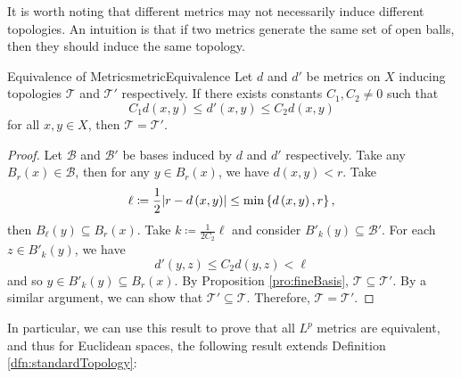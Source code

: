 \documentclass[math]{amznotes}
\theoremstyle{remark}
\begin{document}
It is worth noting that different metrics may not necessarily induce different topologies. An intuition is that if two metrics generate the same set of open balls, then they should induce the same topology.
\begin{probox}{Equivalence of Metrics}{metricEquivalence}
    Let $d$ and $d'$ be metrics on $X$ inducing topologies $\mathcal{T}$ and $\mathcal{T}'$ respectively. If there exists constants $C_1, C_2 \neq 0$ such that 
    \begin{equation*}
        C_1d\left(x, y\right) \leq d'\left(x, y\right) \leq C_2d\left(x, y\right)
    \end{equation*}
    for all $x, y \in X$, then $\mathcal{T} = \mathcal{T}'$.
    \tcblower
    \begin{proof}
        Let $\mathcal{B}$ and $\mathcal{B}'$ be bases induced by $d$ and $d'$ respectively. Take any $B_r\left(x\right) \in \mathcal{B}$, then for any $y \in B_r\left(x\right)$, we have $d\left(x, y\right) < r$. Take 
        \begin{equation*}
            \ell \coloneqq \frac{1}{2}{\left\lvert {r - d\left(x, y\right)} \right\rvert} \leq \min\left\{d\left(x, y\right), r\right\},
        \end{equation*}
        then $B_{\ell}\left(y\right) \subseteq B_r\left(x\right)$. Take $k \coloneqq \frac{1}{2C_2}\ell$ and consider $B'_k\left(y\right) \subseteq \mathcal{B}'$. For each $z \in B'_k\left(y\right)$, we have 
        \begin{equation*}
            d'\left(y, z\right) \leq C_2d\left(y, z\right) < \ell
        \end{equation*}
        and so $y \in B'_k\left(y\right) \subseteq B_r\left(x\right)$. By Proposition \ref{pro:fineBasis}, $\mathcal{T} \subseteq \mathcal{T}'$. By a similar argument, we can show that $\mathcal{T}' \subseteq \mathcal{T}$. Therefore, $\mathcal{T} = \mathcal{T}'$.
    \end{proof}
\end{probox}
In particular, we can use this result to prove that all $L^p$ metrics are equivalent, and thus for Euclidean spaces, the following result extends Definition \ref{dfn:standardTopology}:
\end{document}
